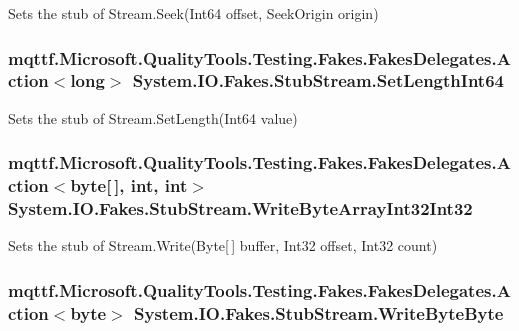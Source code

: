Sets the stub of Stream.\-Seek(\-Int64 offset, Seek\-Origin origin)

\hypertarget{class_system_1_1_i_o_1_1_fakes_1_1_stub_stream_a684017b9b494ad7467072ca54a9d566e}{
\subsubsection[{Set\-Length\-Int64}]{\setlength{\rightskip}{0pt plus 5cm}mqttf.\-Microsoft.\-Quality\-Tools.\-Testing.\-Fakes.\-Fakes\-Delegates.\-Action$<$long$>$ System.\-I\-O.\-Fakes.\-Stub\-Stream.\-Set\-Length\-Int64}}\label{class_system_1_1_i_o_1_1_fakes_1_1_stub_stream_a684017b9b494ad7467072ca54a9d566e}


Sets the stub of Stream.\-Set\-Length(\-Int64 value)

\hypertarget{class_system_1_1_i_o_1_1_fakes_1_1_stub_stream_acb66daf4e96df78ed0bc5c280daa90f1}{
\subsubsection[{Write\-Byte\-Array\-Int32\-Int32}]{\setlength{\rightskip}{0pt plus 5cm}mqttf.\-Microsoft.\-Quality\-Tools.\-Testing.\-Fakes.\-Fakes\-Delegates.\-Action$<$byte\mbox{[}$\,$\mbox{]}, int, int$>$ System.\-I\-O.\-Fakes.\-Stub\-Stream.\-Write\-Byte\-Array\-Int32\-Int32}}\label{class_system_1_1_i_o_1_1_fakes_1_1_stub_stream_acb66daf4e96df78ed0bc5c280daa90f1}


Sets the stub of Stream.\-Write(\-Byte\mbox{[}$\,$\mbox{]} buffer, Int32 offset, Int32 count)

\hypertarget{class_system_1_1_i_o_1_1_fakes_1_1_stub_stream_aeb22e11cc925879d2536f0aef9d4fb6e}{
\subsubsection[{Write\-Byte\-Byte}]{\setlength{\rightskip}{0pt plus 5cm}mqttf.\-Microsoft.\-Quality\-Tools.\-Testing.\-Fakes.\-Fakes\-Delegates.\-Action$<$byte$>$ System.\-I\-O.\-Fakes.\-Stub\-Stream.\-Write\-Byte\-Byte}}\label{class_system_1_1_i_o_1_1_fakes_1_1_stub_stream_aeb22e11cc925879d2536f0aef9d4fb6e}


